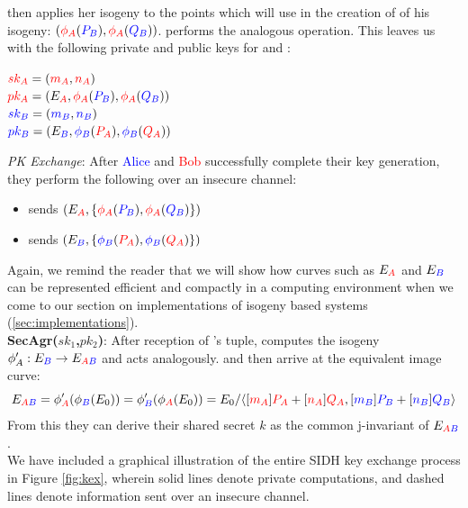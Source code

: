 \alice then applies her isogeny to the points which \bob will use in the creation of of his isogeny: $(\pa(\genpb),\pa(\genqb))$. \bob performs the analogous operation. This leaves us with the following private and public keys for \alice and \bob:

\begin{center}
$\ska = (\ma,\na)$\\
$\pka = (E_{\ba}, \pa(\genpb),\pa(\genqb))$\\
$\skb = (\mb,\nb)$\\
$\pkb = (E_{\rb}, \pb(\genpa),\pb(\genqa))$\\
\end{center}

\noindent
\textit{PK Exchange}: After \textcolor{blue}{Alice} and \textcolor{red}{Bob} successfully complete their key generation, they perform the following over an insecure channel:
\begin{itemize}
\item \alice sends \bob $(E_{\ba}, \{\pa(\genpb),\pa(\genqb)\})$
\item \bob sends \alice $(E_{\rb}, \{\pb(\genpa),\pb(\genqa)\})$
\end{itemize}

Again, we remind the reader that we will show how curves such as $E_{\ba}$ and $E_{\rb}$ can be represented efficient and compactly in a computing environment when we come to our section on implementations of isogeny based systems (\ref{sec:implementations}).\\

\noindent
\textbf{SecAgr($sk_{1}$,$pk_{2}$)}: After reception of \bob's tuple, \alice computes the isogeny $\phi'_A: E_{\rb} \rightarrow E_{\ba\rb}$ and \bob acts analogously. \alice and \bob then arrive at the equivalent image curve:
$$
E_{\ba\rb} = \phi'_{\ba}(\phi_{\rb}(E_0)) = \phi'_{\rb}(\phi_{\ba}(E_0)) = E_0/ \langle [\ma]\genpa + [\na]\genqa, [\mb]\genpb + [\nb]\genqb \rangle
$$
From this they can derive their shared secret $k$ as the common j-invariant of $E_{\ba\rb}$.\\

\noindent
We have included a graphical illustration of the entire SIDH key exchange process in Figure \ref{fig:kex}, wherein solid lines denote private computations, and dashed lines denote information sent over an insecure channel.

